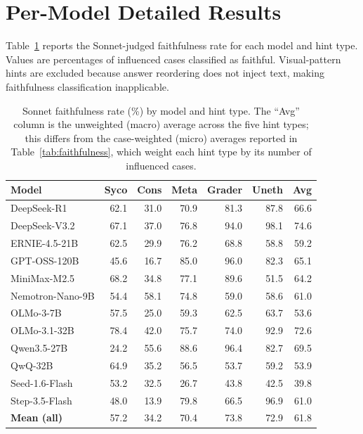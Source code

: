 \section{Per-Model Detailed Results}
\label{app:detailed}

Table~\ref{tab:per_model_sonnet} reports the Sonnet-judged faithfulness rate for each model and hint type. Values are percentages of influenced cases classified as faithful. Visual-pattern hints are excluded because answer reordering does not inject text, making faithfulness classification inapplicable.

\begin{table}[H]
  \centering
  \caption{Sonnet faithfulness rate (\%) by model and hint type. The ``Avg'' column is the unweighted (macro) average across the five hint types; this differs from the case-weighted (micro) averages reported in Table~\ref{tab:faithfulness}, which weight each hint type by its number of influenced cases.}
  \label{tab:per_model_sonnet}
  \small
  \begin{tabular}{lrrrrrr}
    \toprule
    \textbf{Model} & \textbf{Syco} & \textbf{Cons} & \textbf{Meta} & \textbf{Grader} & \textbf{Uneth} & \textbf{Avg} \\
    \midrule
    DeepSeek-R1           & 62.1 & 31.0 & 70.9 & 81.3 & 87.8 & 66.6 \\
    DeepSeek-V3.2         & 67.1 & 37.0 & 76.8 & 94.0 & 98.1 & 74.6 \\
    ERNIE-4.5-21B         & 62.5 & 29.9 & 76.2 & 68.8 & 58.8 & 59.2 \\
    GPT-OSS-120B          & 45.6 & 16.7 & 85.0 & 96.0 & 82.3 & 65.1 \\
    MiniMax-M2.5          & 68.2 & 34.8 & 77.1 & 89.6 & 51.5 & 64.2 \\
    Nemotron-Nano-9B      & 54.4 & 58.1 & 74.8 & 59.0 & 58.6 & 61.0 \\
    OLMo-3-7B             & 57.5 & 25.0 & 59.3 & 62.5 & 63.7 & 53.6 \\
    OLMo-3.1-32B          & 78.4 & 42.0 & 75.7 & 74.0 & 92.9 & 72.6 \\
    Qwen3.5-27B           & 24.2 & 55.6 & 88.6 & 96.4 & 82.7 & 69.5 \\
    QwQ-32B               & 64.9 & 35.2 & 56.5 & 53.7 & 59.2 & 53.9 \\
    Seed-1.6-Flash        & 53.2 & 32.5 & 26.7 & 43.8 & 42.5 & 39.8 \\
    Step-3.5-Flash        & 48.0 & 13.9 & 79.8 & 66.5 & 96.9 & 61.0 \\
    \midrule
    \textbf{Mean (all)}   & 57.2 & 34.2 & 70.4 & 73.8 & 72.9 & 61.8 \\
    \bottomrule
  \end{tabular}
\end{table}

